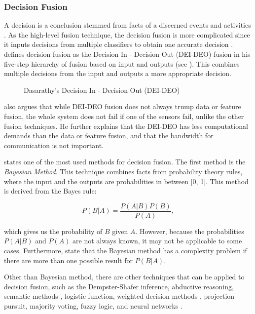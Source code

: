 \subsubsection{Decision Fusion}
A decision is a conclusion stemmed from facts of a discerned events and activities . As the high-level fusion technique, the decision fusion is more complicated since it inputs decisions from multiple classifiers to obtain one accurate decision .  defines decision fusion as the Decision In - Decision Out (DEI-DEO) fusion in his five-step hierarchy of fusion based on input and outputs (see ). This combines multiple decisions from the input and outputs a more appropriate decision.


\begin{figure}[h]
	\centering
	\captionsetup{justification=centering}
	\caption{Dasarathy’s Decision In - Decision Out (DEI-DEO)}
	\label{fig:dei-deo}
\end{figure}

 also argues that while DEI-DEO fusion does not always trump data or feature fusion, the whole system does not fail if one of the sensors fail, unlike the other fusion techniques. He further explains that the DEI-DEO has less computational demands than the data or feature fusion, and that the bandwidth for communication is not important.

 states one of the most used methods for decision fusion. The first method is the \textit{Bayesian Method}. This technique combines facts from probability theory rules, where the input and the outputs are probabilities in between [0, 1]. This method is derived from the Bayes rule: 

\begin{equation}
P(B | A) = \frac{P(A | B) P(B)}{P(A)},
\end{equation}

\noindent which gives us the probability of $B$ given $A$. However, because the probabilities $P(A | B)$ and $P(A)$ are not always known, it may not be applicable to some cases. Furthermore,  state that the Bayesian method has a complexity problem if there are more than one possible result for $P(B | A)$. 

Other than Bayesian method, there are other techniques that can be applied to decision fusion, such as the Dempster-Shafer inference, abductive reasoning, semantic methods , logistic function, weighted decision methods , projection pursuit, majority voting, fuzzy logic, and neural networks . 


